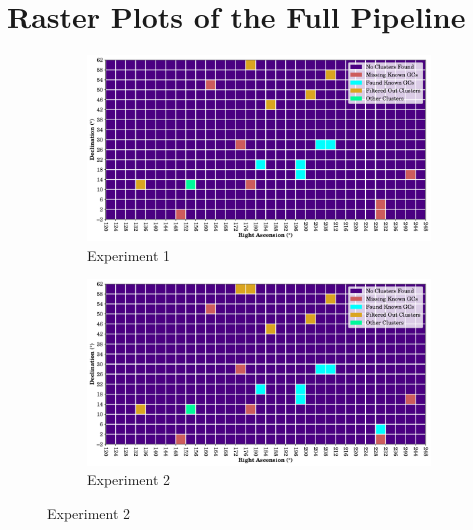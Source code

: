 \chapter{Raster Plots of the Full Pipeline}
\begin{figure}[H]
    \centering
    \caption{\label{fig:a1-cluster-overview}Clustering Results Across A1 for All Experiments}
    \begin{subfigure}[b]{0.49\textwidth}
        \includegraphics[width=\textwidth]{./figures/rasters/grids/grid-run-01-a1.pdf}
        \caption{Experiment 1}
    \end{subfigure}
    \begin{subfigure}[b]{0.49\textwidth}
        \includegraphics[width=\textwidth]{./figures/rasters/grids/grid-run-02-a1.pdf}
        \caption{Experiment 2}
    \end{subfigure}


\end{figure}
